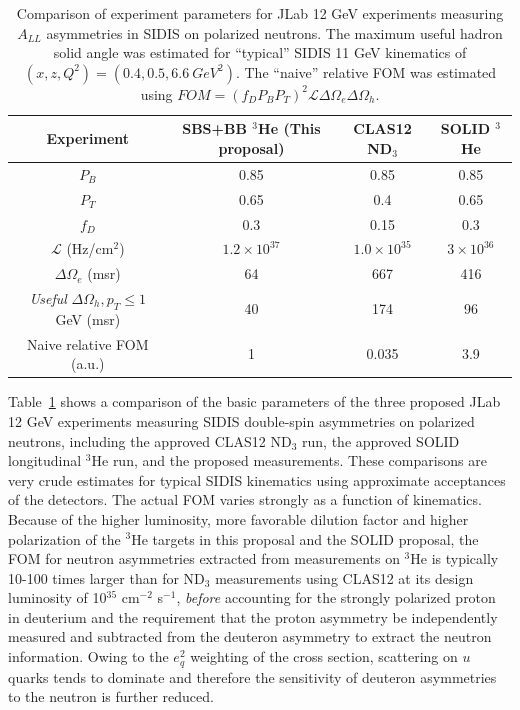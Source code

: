 \begin{table}[h]
  \caption{\label{naiveFOMcomp} Comparison of experiment parameters for JLab 12 GeV experiments measuring $A_{LL}$ asymmetries in SIDIS on polarized neutrons. The maximum useful hadron solid angle was estimated for ``typical'' SIDIS 11 GeV kinematics of $(x,z,Q^2)=(0.4,0.5,6.6\ GeV^2)$. The ``naive'' relative FOM was estimated using $FOM = (f_D P_B P_T)^2 \mathcal{L} \Delta \Omega_e \Delta \Omega_h$.}
  \begin{center}
    \begin{tabular}{cccc}
      \hline \hline Experiment & SBS+BB $^3$He (This proposal) & CLAS12 ND$_3$ & SOLID $^3$He \\ \hline 
      $P_B$ & 0.85 & 0.85 & 0.85 \\ 
      $P_T$ & 0.65 & 0.4 & 0.65 \\
      $f_D$ & 0.3 & 0.15 & 0.3 \\ 
      $\mathcal{L}$ (Hz/cm$^2$) & $1.2 \times 10^{37}$ & $1.0 \times 10^{35}$ & $3 \times 10^{36}$ \\ 
      $\Delta \Omega_e$ (msr) & 64 & 667 & 416 \\
      \emph{Useful} $\Delta \Omega_h, p_T \le 1$ GeV (msr) & 40 & 174 & 96 \\ \hline 
      Naive relative FOM (a.u.) & 1 & 0.035 & 3.9   
    \end{tabular}
  \end{center}
\end{table}
Table~\ref{naiveFOMcomp} shows a comparison of the basic parameters of the three proposed JLab 12 GeV experiments measuring SIDIS double-spin asymmetries on polarized neutrons, including the approved CLAS12 ND$_3$ run, the approved SOLID longitudinal $^3$He run, and the proposed measurements. These comparisons are very crude estimates for typical SIDIS kinematics using approximate acceptances of the detectors. The actual FOM varies strongly as a function of kinematics. Because of the higher luminosity, more favorable dilution factor and higher polarization of the $^3$He targets in this proposal and the SOLID proposal, the FOM for neutron asymmetries extracted from measurements on $^3$He is typically 10-100 times larger than for ND$_3$ measurements using CLAS12 at its design luminosity of 10$^{35}$ cm$^{-2}$ s$^{-1}$, \emph{before} accounting for the strongly polarized proton in deuterium and the requirement that the proton asymmetry be independently measured and subtracted from the deuteron asymmetry to extract the neutron information. Owing to the $e_q^2$ weighting of the cross section, scattering on $u$ quarks tends to dominate and therefore the sensitivity of deuteron asymmetries to the neutron is further reduced. 

